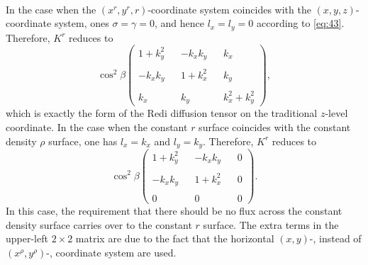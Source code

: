 \documentclass[12pt]{report}
\begin{document}
\\
In the case when the $(x^r, y^r, r)$-coordinate system coincides with
the $(x,y,z)$-coordinate system, ones $\sigma=\gamma=0$, and hence
$l_x = l_y=0$ according to \eqref{eq:43}. Therefore, $K^r$ reduces to
\begin{equation*}
\cos^2\beta\left(
    \begin{matrix}
      1 + k_y^2 & { }  &  -k_xk_y & { } & {k_x }\\
          { }   &     { }   & { } & { } & { }\\
      -k_xk_y & { } & 1 + k_x^2 & { } & {k_y }\\
         { } & { } & { } & { } & { } \\
         {k_x} & { } & {k_y } & { } & k_x^2 + k_y^2
    \end{matrix}\right),
\end{equation*}
which is exactly the form of the Redi diffusion tensor on the
traditional $z$-level coordinate. In the case when the constant $r$
surface coincides with the constant density $\rho$ surface, one has
$l_x = k_x$ and $l_y=k_y$. Therefore, $K^r$ reduces to 
\begin{equation*}
\cos^2\beta\left(
    \begin{matrix}
      1 + k_y^2 & { }  &  -k_xk_y & { } & { 0 }\\
          { }   &     { }   & { } & { } & { }\\
      -k_xk_y & { } & 1 + k_x^2 & { } & {0 }\\
         { } & { } & { } & { } & { } \\
         {0} & { } & {0 } & { } & 0
    \end{matrix}\right).
\end{equation*}
In this case, the requirement that there should be no flux across the
constant density surface carries over to the constant $r$ surface. The
extra terms in the upper-left $2\times 2$ matrix are due to the fact
that the horizontal $(x,y)$-, instead of $(x^\rho, y^\rho)$-,
coordinate system are used. 
\end{document}
